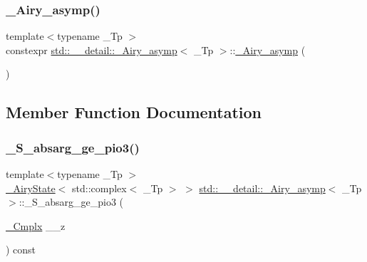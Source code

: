 \subsubsection{\texorpdfstring{\+\_\+\+Airy\+\_\+asymp()}{\_Airy\_asymp()}}
{\footnotesize\ttfamily template$<$typename \+\_\+\+Tp $>$ \\
constexpr \hyperlink{classstd_1_1____detail_1_1__Airy__asymp}{std\+::\+\_\+\+\_\+detail\+::\+\_\+\+Airy\+\_\+asymp}$<$ \+\_\+\+Tp $>$\+::\hyperlink{classstd_1_1____detail_1_1__Airy__asymp}{\+\_\+\+Airy\+\_\+asymp} (\begin{DoxyParamCaption}{ }\end{DoxyParamCaption})\hspace{0.3cm}{\ttfamily [default]}}



\subsection{Member Function Documentation}
\mbox{\label{classstd_1_1____detail_1_1__Airy__asymp_ac3429a56fa955a3b8a71d450fd9662a6}} 
\subsubsection{\texorpdfstring{\+\_\+\+S\+\_\+absarg\+\_\+ge\+\_\+pio3()}{\_S\_absarg\_ge\_pio3()}}
{\footnotesize\ttfamily template$<$typename \+\_\+\+Tp $>$ \\
\hyperlink{structstd_1_1____detail_1_1__AiryState}{\+\_\+\+Airy\+State}$<$ std\+::complex$<$ \+\_\+\+Tp $>$ $>$ \hyperlink{classstd_1_1____detail_1_1__Airy__asymp}{std\+::\+\_\+\+\_\+detail\+::\+\_\+\+Airy\+\_\+asymp}$<$ \+\_\+\+Tp $>$\+::\+\_\+\+S\+\_\+absarg\+\_\+ge\+\_\+pio3 (\begin{DoxyParamCaption}\item[{\hyperlink{classstd_1_1____detail_1_1__Airy__asymp_ae28f102423d34e78502ab6da42d67f50}{\+\_\+\+Cmplx}}]{\+\_\+\+\_\+z }\end{DoxyParamCaption}) const}



